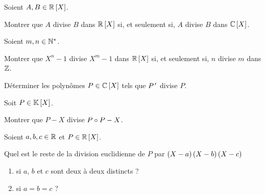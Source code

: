 \begin{corr}
\end{corr}

\begin{exo}
Soient \(A,B\in\poly[\R]\).

Montrer que \(A\) divise \(B\) dans \(\poly[\R]\) si, et seulement si, \(A\) divise \(B\) dans \(\poly[\C]\).
\end{exo}

\begin{corr}
\end{corr}

\begin{exo}
Soient \(m,n\in\mathbb{N}^*\).

Montrer que \(X^n-1\) divise \(X^m-1\) dans \(\poly[\R]\) si, et seulement si, \(n\) divise \(m\) dans \(\mathbb{Z}\).
\end{exo}

\begin{corr}
\end{corr}

\begin{exo}
Déterminer les polynômes \(P\in\poly[\C]\) tels que \(P^{\,\prime}\) divise \(P\).
\end{exo}

\begin{corr}
\end{corr}

\begin{exo}
Soit \(P\in\poly\).

Montrer que \(P-X\) divise \(P\circ P-X\).
\end{exo}

\begin{corr}
\end{corr}

\begin{exo}[Devinettes]
Soient \(a,b,c\in\mathbb{R}\) et \(P\in\poly[\R]\).

Quel est le reste de la division euclidienne de \(P\) par \(\left(X-a\right)\left(X-b\right)\left(X-c\right)\)

\begin{enumerate}
\item si \(a\), \(b\) et \(c\) sont deux à deux distincts ? \\

\item si \(a=b=c\) ?
\end{enumerate}
\end{exo}

